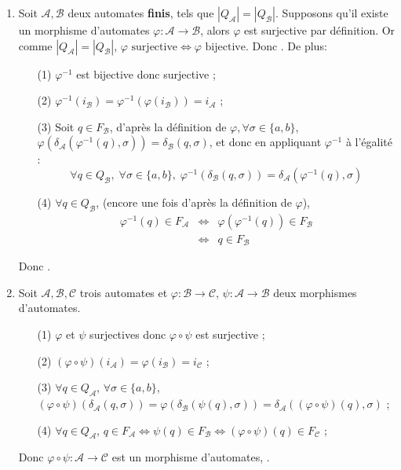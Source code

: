 \documentclass{article}
\begin{document}
\begin{enumerate}
    \item \label{itm:isomorphisme} Soit $\mathcal{A}, \mathcal{B}$ deux automates \textbf{finis}, tels que $|Q_\mathcal{A}| = |Q_\mathcal{B}|$. Supposons qu'il existe un morphisme d'automates $\varphi : \mathcal{A} \rightarrow \mathcal{B}$, alors $\varphi$ est surjective par définition. Or comme $|Q_\mathcal{A}| = |Q_\mathcal{B}|$, $\varphi \text{ surjective} \Leftrightarrow \varphi \text{ bijective}$. Donc . \newline
    De plus: \begin{itemize}
        \item[(1)] $\varphi^{-1}$ est bijective donc surjective ;
        \item[(2)]  $\varphi^{-1}(i_\mathcal{B}) = \varphi^{-1}(\varphi(i_\mathcal{B})) = i_\mathcal{A}$ ;
        \item[(3)]  Soit $q \in F_\mathcal{B}$, d'après la définition de $\varphi, \forall \sigma \in \{ a, b\}$, $\varphi(\delta_\mathcal{A}(\varphi^{-1}(q), \sigma)) = \delta_\mathcal{B}(q, \sigma)$, et donc en appliquant $\varphi^{-1}$ à l'égalité :
        $$ \forall q \in Q_\mathcal{B}, \; \forall \sigma \in \{ a, b\}, \; \varphi^{-1}(\delta_\mathcal{B}(q, \sigma)) = \delta_\mathcal{A}(\varphi^{-1}(q), \sigma) $$
        \item[(4)]  $\forall q \in Q_\mathcal{B}$, (encore une fois d'après la définition de $\varphi$), \begin{eqnarray*}
            \varphi^{-1}(q) \in F_\mathcal{A} & \Longleftrightarrow & \varphi(\varphi^{-1}(q)) \in F_\mathcal{B} \\
            & \Longleftrightarrow & q \in F_\mathcal{B}
        \end{eqnarray*}
    \end{itemize}
    Donc .
    \item \label{itm:composition} Soit $\mathcal{A}, \mathcal{B}, \mathcal{C}$ trois automates et  $\varphi : \mathcal{B} \rightarrow \mathcal{C}$,  $\psi : \mathcal{A} \rightarrow \mathcal{B}$ deux morphismes d'automates.
    \begin{itemize}
        \item[(1)]  $\varphi$ et $\psi$ surjectives donc $\varphi \circ \psi$ est surjective ;
        \item[(2)]  $(\varphi \circ \psi)(i_\mathcal{A}) = \varphi(i_\mathcal{B}) = i_\mathcal{C}$ ;
        \item[(3)]  $\forall q \in Q_\mathcal{A}$, $\forall \sigma \in \{ a, b\}$, $(\varphi \circ \psi)(\delta_\mathcal{A}(q, \sigma)) = \varphi(\delta_\mathcal{B}(\psi(q), \sigma)) = \delta_\mathcal{A}((\varphi \circ \psi)(q), \sigma)$ ;
        \item[(4)]  $\forall q \in Q_\mathcal{A}$, $q \in F_\mathcal{A} \Longleftrightarrow \psi(q) \in F_\mathcal{B} \Longleftrightarrow (\varphi \circ \psi)(q) \in F_\mathcal{C}$ ;
    \end{itemize}
    Donc $\varphi \circ \psi : \mathcal{A} \rightarrow \mathcal{C}$ est un morphisme d'automates, .
\end{enumerate}
\end{document}
